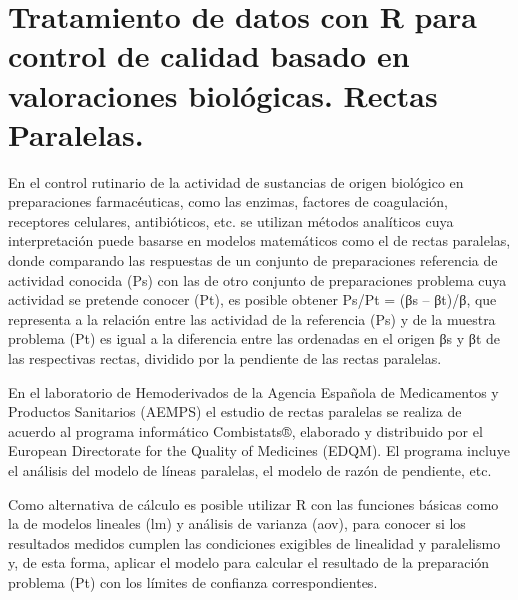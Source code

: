 \chapter{Tratamiento de datos con R para control de calidad basado en valoraciones biológicas. Rectas Paralelas.}




En el control rutinario de la actividad de sustancias de origen biológico en preparaciones farmacéuticas, como las enzimas, factores de coagulación, receptores celulares, antibióticos, etc. se utilizan métodos analíticos cuya interpretación puede basarse en modelos matemáticos como el de rectas paralelas, donde comparando las respuestas de un conjunto de preparaciones referencia de actividad conocida (Ps) con las de otro conjunto de preparaciones problema cuya actividad se pretende conocer (Pt), es posible obtener Ps/Pt = (βs – βt)/β, que representa a la relación entre las actividad de la referencia (Ps) y de la muestra problema (Pt) es igual a la diferencia entre las ordenadas en el origen βs y βt de las respectivas rectas, dividido por la pendiente de las rectas paralelas.

En el laboratorio de Hemoderivados de la Agencia Española de Medicamentos y Productos Sanitarios (AEMPS) el estudio de rectas paralelas se realiza de acuerdo al programa informático Combistats®, elaborado y distribuido por el European Directorate for the Quality of Medicines (EDQM). El programa incluye el análisis del modelo de líneas paralelas, el modelo de razón de pendiente, etc.

Como alternativa de cálculo es posible utilizar R con las funciones básicas como la de modelos lineales (lm) y análisis de varianza (aov), para conocer si los resultados medidos cumplen las condiciones exigibles de linealidad y paralelismo y, de esta forma, aplicar el modelo para calcular el resultado de la preparación problema (Pt) con los límites de confianza correspondientes.


